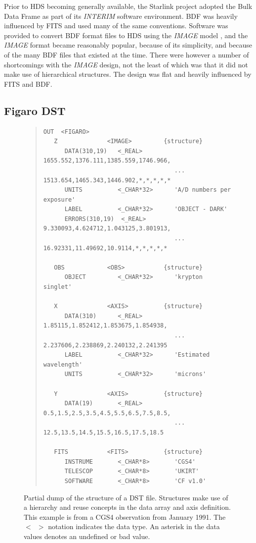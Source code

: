 \documentclass[final,authoryear,5p,times,twocolumn]{elsarticle}
\begin{document}
Prior to HDS becoming generally available, the Starlink project adopted
the Bulk Data Frame \citep[BDF;][]{1980SPIE..264...70P,SUN4} as part
of its \emph{INTERIM} software environment.  BDF was heavily influenced
by FITS and used many of the same conventions.  Software was provided
to convert BDF format files to HDS using the \emph{IMAGE} model
\citep{SUN96}, and
the \emph{IMAGE} format became reasonably popular, because of its
simplicity, and because of the many BDF files that existed at the time.
There were however
a number of shortcomings with the \emph{IMAGE} design, not the least of which was
that it did not make use of hierarchical structures. The design was
flat and heavily influenced by FITS and BDF.

\subsection{Figaro DST}

\begin{figure}[t]
\begin{minipage}{\textwidth}
\begin{quote}
\small
\begin{verbatim}
OUT  <FIGARO>
   Z              <IMAGE>         {structure}
      DATA(310,19)   <_REAL>         1655.552,1376.111,1385.559,1746.966,
                                     ... 1513.654,1465.343,1446.902,*,*,*,*,*
      UNITS          <_CHAR*32>      'A/D numbers per exposure'
      LABEL          <_CHAR*32>      'OBJECT - DARK'
      ERRORS(310,19)  <_REAL>        9.330093,4.624712,1.043125,3.801913,
                                     ... 16.92331,11.49692,10.9114,*,*,*,*,*

   OBS            <OBS>           {structure}
      OBJECT         <_CHAR*32>      'krypton singlet'

   X              <AXIS>          {structure}
      DATA(310)      <_REAL>         1.85115,1.852412,1.853675,1.854938,
                                     ... 2.237606,2.238869,2.240132,2.241395
      LABEL          <_CHAR*32>      'Estimated wavelength'
      UNITS          <_CHAR*32>      'microns'

   Y              <AXIS>          {structure}
      DATA(19)       <_REAL>         0.5,1.5,2.5,3.5,4.5,5.5,6.5,7.5,8.5,
                                     ... 12.5,13.5,14.5,15.5,16.5,17.5,18.5

   FITS           <FITS>          {structure}
      INSTRUME       <_CHAR*8>       'CGS4'
      TELESCOP       <_CHAR*8>       'UKIRT'
      SOFTWARE       <_CHAR*8>       'CF v1.0'
\end{verbatim}
\end{quote}
\caption{Partial dump of the structure of a DST file. Structures make
  use of a hierarchy and reuse concepts in the data array and axis
  definition. This example is from a CGS4 observation from January
  1991. The \texttt{$<$~$>$} notation indicates the data type.  An
  asterisk in the data values denotes an undefined or bad value.}
\label{fig:dst}
\end{minipage}
\end{figure}
\end{document}
